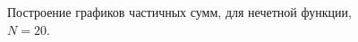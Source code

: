 \documentclass[a5paper, 10pt]{article}
\theoremstyle{definition}
\theoremstyle{plain}
\theoremstyle{remark}
\begin{document}
\begin{figure}[h]
\begin{minipage}[h]{0.5\linewidth}
\end{minipage}
\hfill
\begin{minipage}[h]{0.5\linewidth}
\end{minipage}
\caption{Построение графиков частичных сумм, для нечетной функции, $N=20$.}


\end{figure}
\end{document}

